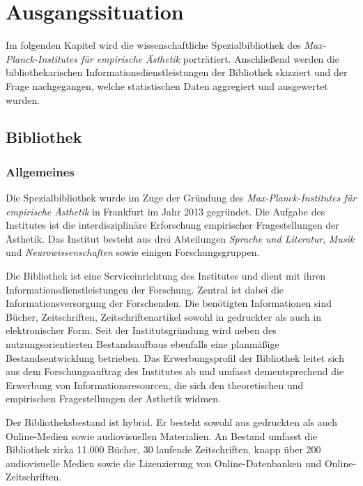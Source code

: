 \chapter{Ausgangssituation}



Im folgenden Kapitel wird die wissenschaftliche Spezialbibliothek des \textit{Max-Planck-Institutes für empirische Ästhetik} 
porträtiert. Anschließend werden die bibliothekarischen Informationsdienstleistungen der Bibliothek 
skizziert und der Frage nachgegangen, welche statistischen Daten aggregiert und ausgewertet wurden. 

\section{Bibliothek}
\subsection{Allgemeines}
Die Spezialbibliothek wurde im Zuge der Gründung des \textit{Max-Planck-Institutes für empirische Ästhetik} 
in Frankfurt im Jahr 2013 gegründet. Die Aufgabe des Institutes ist die interdisziplinäre Erforschung 
empirischer Fragestellungen der Ästhetik. Das Institut besteht aus drei Abteilungen \textit{Sprache und Literatur}, 
\textit{Musik} und \textit{Neurowissenschaften} sowie einigen Forschungsgruppen. %



Die Bibliothek ist eine Serviceinrichtung des Institutes und dient mit ihren Informationsdienstleistungen 
der Forschung.
Zentral ist dabei die Informationsversorgung der Forschenden. Die benötigten Informationen sind Bücher, 
Zeitschriften, Zeitschriftenartikel sowohl in gedruckter als auch in elektronischer Form.
Seit der Institutsgründung wird neben des nutzungsorientierten Bestandsaufbaus ebenfalls eine planmäßige 
Bestandsentwicklung betrieben. Das Erwerbungsprofil der Bibliothek leitet sich aus dem Forschungsauftrag des Institutes 
ab und umfasst dementsprechend die Erwerbung von Informationsresourcen, die sich den theoretischen und 
empirischen Fragestellungen der Ästhetik widmen.

Der Bibliotheksbestand ist hybrid. Er besteht sowohl aus gedruckten als auch Online-Medien sowie 
audiovisuellen Materialien. An Bestand umfasst die Bibliothek zirka 11.000 Bücher, 30 laufende Zeitschriften, 
knapp über 200 audiovisuelle Medien sowie die Lizenzierung von Online-Datenbanken
und Online-Zeitschriften.

